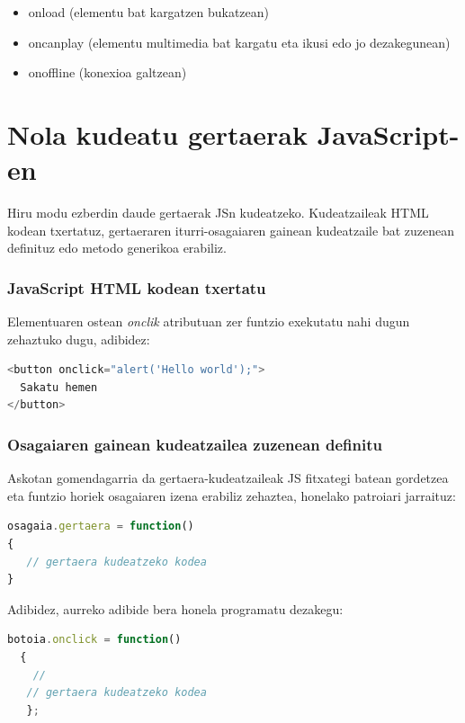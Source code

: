 \begin{itemize}
\item {} onload (elementu bat kargatzen bukatzean)
\item {} oncanplay (elementu multimedia bat kargatu eta ikusi edo jo dezakegunean)
\item {} onoffline (konexioa galtzean)
\end{itemize}


\section{Nola kudeatu gertaerak JavaScript-en}

Hiru modu ezberdin daude gertaerak JSn kudeatzeko. Kudeatzaileak HTML kodean txertatuz, gertaeraren iturri-osagaiaren gainean kudeatzaile bat zuzenean definituz edo  metodo generikoa erabiliz.

\subsubsection{JavaScript HTML kodean txertatu}

Elementuaren ostean \textit{onclik} atributuan zer funtzio exekutatu nahi dugun zehaztuko dugu, adibidez:

\begin{lstlisting}[language=JavaScript,numbers=none]
<button onclick="alert('Hello world');">
  Sakatu hemen
</button>
\end{lstlisting}

\subsubsection{Osagaiaren gainean kudeatzailea zuzenean definitu}

Askotan gomendagarria da gertaera-kudeatzaileak JS fitxategi batean gordetzea eta funtzio horiek osagaiaren izena erabiliz zehaztea, honelako patroiari jarraituz:

\begin{lstlisting}[language=JavaScript,numbers=none]
osagaia.gertaera = function()
{
   // gertaera kudeatzeko kodea
}
\end{lstlisting}

Adibidez, aurreko adibide bera honela programatu dezakegu:
\begin{lstlisting}[language=JavaScript,numbers=none]
  botoia.onclick = function()
  {
    //
   // gertaera kudeatzeko kodea
   };
\end{lstlisting}

